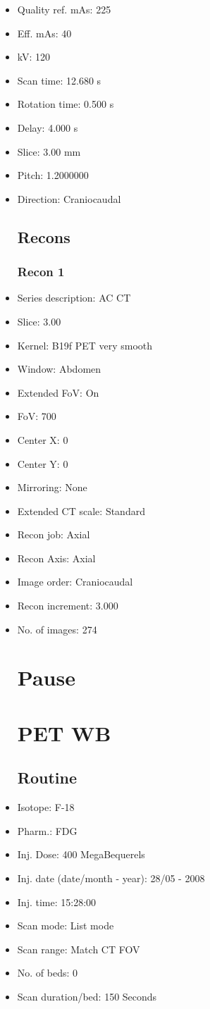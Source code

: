 \documentclass[12pt]{article}
\begin{document}
\begin{itemize}
\subsection{Scan}
\item Quality ref. mAs: 225\item Eff. mAs: 40\item kV: 120\item Scan time: 12.680 s\item Rotation time: 0.500 s\item Delay: 4.000 s\item Slice: 3.00 mm\item Pitch: 1.2000000\item Direction: Craniocaudal\subsection{Recons}

\subsubsection{Recon 1}
\item Series description: AC CT
\item Slice: 3.00
\item Kernel: B19f PET very smooth
\item Window: Abdomen
\item Extended FoV: On
\item FoV: 700
\item Center X: 0
\item Center Y: 0
\item Mirroring: None
\item Extended CT scale: Standard
\item Recon job: Axial
\item Recon Axis: Axial
\item Image order: Craniocaudal
\item Recon increment: 3.000
\item No. of images: 274
\section{Pause}
\section{PET WB}\subsection{Routine}
\item Isotope: F-18
\item Pharm.: FDG
\item Inj. Dose: 400 MegaBequerels
\item Inj. date (date/month - year): 28/05 - 2008
\item Inj. time: 15:28:00
\item Scan mode: List mode
\item Scan range: Match CT FOV
\item No. of beds: 0
\item Scan duration/bed: 150 Seconds

\end{itemize}
\end{document}
